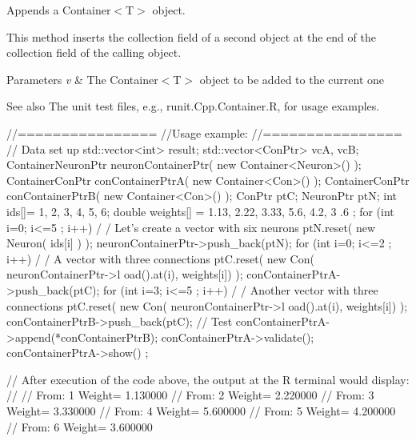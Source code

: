 Appends a Container$<$T$>$ object. 

This method inserts the collection field of a second object at the end of the collection field of the calling object. 
\begin{DoxyParams}{Parameters}
{\em v} & The Container$<$T$>$ object to be added to the current one \\
\hline
\end{DoxyParams}
\begin{DoxySeeAlso}{See also}
The unit test files, e.g., runit.Cpp.Container.R, for usage examples.
\end{DoxySeeAlso}

\begin{DoxyCode}
        //================
        //Usage example:
        //================
        // Data set up
                                std::vector<int> result;
                                std::vector<ConPtr> vcA, vcB;
                                ContainerNeuronPtr      neuronContainerPtr( new 
      Container<Neuron>() );
                                ContainerConPtr conContainerPtrA( new 
      Container<Con>() );
                                ContainerConPtr conContainerPtrB( new 
      Container<Con>() );
                                ConPtr  ptC;
                                NeuronPtr ptN;
                                int ids[]= {1, 2, 3, 4, 5, 6};
                                double weights[] = {1.13, 2.22, 3.33, 5.6, 4.2, 3
      .6 };
                                for (int i=0; i<=5 ; i++) {                             /
      / Let's create a vector with six neurons
                                        ptN.reset( new Neuron( ids[i] ) );
                                        neuronContainerPtr->push_back(ptN);
                                }
                                for (int i=0; i<=2 ; i++) {                             /
      / A vector with three connections
                                        ptC.reset( new Con( neuronContainerPtr->l
      oad().at(i), weights[i]) );
                                        conContainerPtrA->push_back(ptC);
                                }
                                for (int i=3; i<=5 ; i++) {                             /
      / Another vector with three connections
                                        ptC.reset( new Con( neuronContainerPtr->l
      oad().at(i), weights[i]) );
                                        conContainerPtrB->push_back(ptC);
                                }
        // Test
                                conContainerPtrA->append(*conContainerPtrB);
                                conContainerPtrA->validate();
                                conContainerPtrA->show() ;

        // After execution of the code above, the output at the R terminal would 
      display:
        //
        //  From:        1       Weight=         1.130000
        //      From:    2       Weight=         2.220000
        //      From:    3       Weight=         3.330000
        //      From:    4       Weight=         5.600000
        //      From:    5       Weight=         4.200000
        //      From:    6       Weight=         3.600000
\end{DoxyCode}


